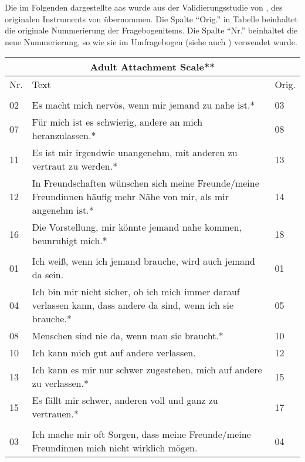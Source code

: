 
Die im Folgenden dargestellte \acrfull{aas} wurde aus der Validierungsstudie von , des originalen Instruments von  übernommen. Die Spalte \enquote{Orig.} in Tabelle  beinhaltet die originale Nummerierung der Fragebogenitems. Die Spalte \enquote{Nr.} beinhaltet die neue Nummerierung, so wie sie im Umfragebogen (siehe auch ) verwendet wurde.


\begin{table}[htbp]
\begin{tabular}{|l | m{30em} | p{2em}|} 
  \hline
  \multicolumn{3}{|c|}{\textbf{Adult Attachment Scale**}}\\
  \hline
  Nr. & Text & Orig. \\ 
  \hline\hline
  \rowcolor{lightgray}
  \multicolumn{3}{|l|}{Nähe}\\
  \hline
  02 & Es macht mich nervös, wenn mir jemand zu nahe ist.* & 03 \\
  07 & Für mich ist es schwierig, andere an mich heranzulassen.* & 08 \\
  11 & Es ist mir irgendwie unangenehm, mit anderen zu vertraut zu werden.* & 13 \\
  12 & In Freundschaften wünschen sich meine Freunde/meine Freundinnen häufig mehr Nähe von mir, als mir angenehm ist.* & 14 \\
  16 & Die Vorstellung, mir könnte jemand nahe kommen, beunruhigt mich.* & 18 \\
  \hline
  \rowcolor{lightgray} \multicolumn{3}{|l|}{Vertrauen}\\
  \hline
  01 & Ich weiß, wenn ich jemand brauche, wird auch jemand da sein. & 01 \\
  04 & Ich bin mir nicht sicher, ob ich mich immer darauf verlassen kann, dass andere da sind, wenn ich sie brauche.* & 05\\
  08 & Menschen sind nie da, wenn man sie braucht.* & 10 \\
  10 & Ich kann mich gut auf andere verlassen. & 12\\
  13 & Ich kann es mir nur schwer zugestehen, mich auf andere zu verlassen.* & 15\\
  15 & Es fällt mir schwer, anderen voll und ganz zu vertrauen.* & 17\\
  \hline
  \rowcolor{lightgray} \multicolumn{3}{|l|}{Angst}\\
  \hline
  03 & Ich mache mir oft Sorgen, dass meine Freunde/meine Freundinnen mich nicht wirklich mögen. & 04\\

\end{tabular}
\end{table}
